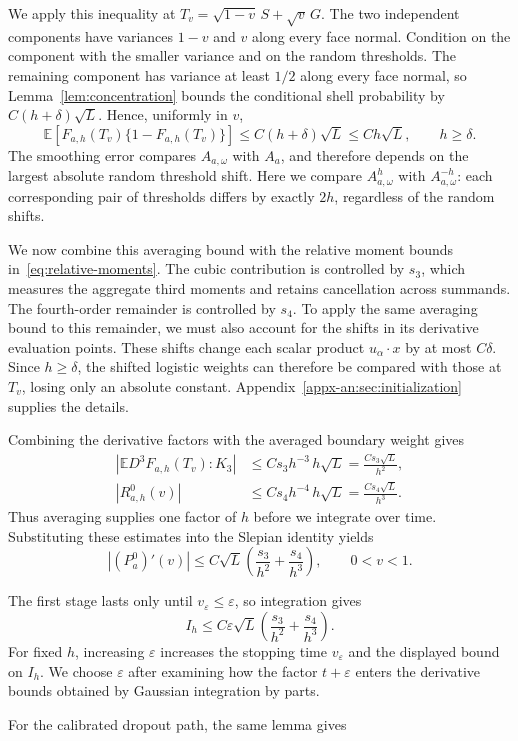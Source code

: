 \documentclass[11pt,letterpaper]{article}
\theoremstyle{remark}
\newcommand{\E}{\mathbb E}
\begin{document}
{{{We apply this inequality at \(T_v=\sqrt{1-v}\,S+\sqrt v\,G\).
The two independent components have variances \(1-v\) and \(v\)
along every face normal. Condition on the component with the smaller
variance and on the random thresholds. The remaining component has
variance at least \(1/2\) along every face normal, so
Lemma~\ref{lem:concentration} bounds the conditional shell probability
by \(C(h+\delta)\sqrt L\). Hence, uniformly in \(v\),
\[
 \E[F_{a,h}(T_v)\{1-F_{a,h}(T_v)\}]
 \le C(h+\delta)\sqrt L\le Ch\sqrt L,
 \qquad {h\ge\delta}.
\]
The smoothing error compares \(A_{a,\omega}\) with \(A_a\), and
therefore depends on the largest absolute random threshold shift.
Here we compare \(A_{a,\omega}^{h}\) with \(A_{a,\omega}^{-h}\):
each corresponding pair of thresholds differs by exactly \(2h\),
regardless of the random shifts.
}

We now combine this averaging bound with the relative moment bounds
in~\eqref{eq:relative-moments}. The cubic contribution is controlled by
\(s_3\), which measures the aggregate third moments and retains
cancellation across summands. The fourth-order remainder is controlled
by \(s_4\). To apply the same averaging bound to this remainder, we must
also account for the shifts in its derivative evaluation points.
These shifts change each scalar product \(u_\alpha\cdot x\) by at most
\(C\delta\). {Since \(h\ge\delta\)}, the shifted logistic weights
can therefore be compared with those at \(T_v\), losing only an
absolute constant. Appendix~\ref{appx-an:sec:initialization} supplies the details.
}

Combining the derivative factors with the averaged boundary weight
gives
\[
\begin{aligned}
 \left|\E D^3F_{a,h}(T_v):K_3\right|
 &\le Cs_3h^{-3}\,h\sqrt L
 =\frac{Cs_3\sqrt L}{h^2},\\
 |R^0_{a,h}(v)|
 &\le Cs_4h^{-4}\,h\sqrt L
 =\frac{Cs_4\sqrt L}{h^3}.
\end{aligned}
\]
Thus averaging supplies one factor of \(h\) before we integrate over
time. Substituting these estimates into the Slepian identity yields
\[
 |(P_a^0)'(v)|
 \le C\sqrt L\left(\frac{s_3}{h^2}+\frac{s_4}{h^3}\right),
 \qquad 0<v<1.
\]

{
The first stage lasts only until \(v_\varepsilon\le\varepsilon\),
so integration gives
\[
 I_h\le C\varepsilon\sqrt L
       \left(\frac{s_3}{h^2}+\frac{s_4}{h^3}\right).
\]
For fixed \(h\), increasing \(\varepsilon\) increases the stopping
time \(v_\varepsilon\) and the displayed bound on \(I_h\). We choose
\(\varepsilon\) after examining how the factor \(t+\varepsilon\)
enters the derivative bounds obtained by Gaussian integration by parts.
}

For the calibrated dropout path, the same lemma gives}
\end{document}
